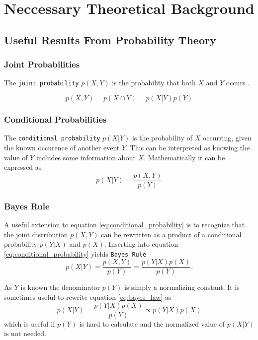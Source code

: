 \chapter{Neccessary Theoretical Background}

\section{Useful Results From Probability Theory}
 
\subsection{Joint Probabilities}
The \texttt{joint probability} $p(X, Y)$ is the probability that both $X$ and $Y$ occurs \cite[p.~29]{murphy}.

\begin{equation}
    p(X, Y) = p(X \cap Y) = p(X | Y)p(Y)
\end{equation}

\subsection{Conditional Probabilities}
The \texttt{conditional probability} $p(X | Y)$ is the probability of $X$ occurring, given the known occurence of another event $Y$. This can be interpreted as knowing the value of $Y$ includes some information about $X$. Mathematically it can be expressed as \cite[p.~29]{murphy}
\begin{equation}\label{eq:conditional_probability}
    p(X | Y) = \frac{p(X, Y)}{p(Y)}
\end{equation}

\subsection{Bayes Rule}

A useful extension to equation \eqref{eq:conditional_probability} is to recognize that the joint distribution $p(X, Y)$ can be rewritten as a product of a conditional probability $p(Y | X)$ and $p(X)$. Inserting into equation \eqref{eq:conditional_probability} yields \texttt{Bayes Rule}
\begin{equation}\label{eq:bayes_law}
    p(X | Y) = \frac{p(X, Y)}{p(Y)} = \frac{p(Y | X)p(X)}{p(Y)}.
\end{equation}

As $Y$ is known the denominator $p(Y)$ is simply a normalizing constant. It is sometimes useful to rewrite equation \eqref{eq:bayes_law} as
\begin{equation}\label{eq:bayes_law_proportional}
    p(X | Y) = \frac{p(Y | X) p(X)}{p(Y)} \propto p(Y | X)p(X)
\end{equation} 
which is useful if $p(Y)$ is hard to calculate and the normalized value of $p(X | Y)$ is not needed.

